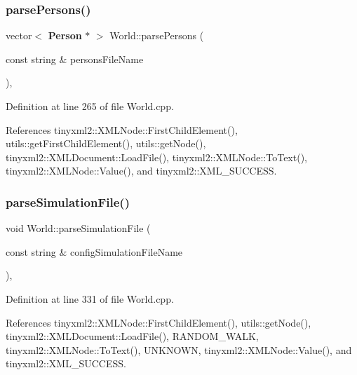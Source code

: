 \subsubsection{parsePersons()}
{\footnotesize\ttfamily vector$<$ \textbf{ Person} $\ast$ $>$ World\+::parse\+Persons (\begin{DoxyParamCaption}\item[{const string \&}]{persons\+File\+Name }\end{DoxyParamCaption})\hspace{0.3cm}{\ttfamily [private]}, {\ttfamily [noexcept]}}



Definition at line 265 of file World.\+cpp.



References tinyxml2\+::\+X\+M\+L\+Node\+::\+First\+Child\+Element(), utils\+::get\+First\+Child\+Element(), utils\+::get\+Node(), tinyxml2\+::\+X\+M\+L\+Document\+::\+Load\+File(), tinyxml2\+::\+X\+M\+L\+Node\+::\+To\+Text(), tinyxml2\+::\+X\+M\+L\+Node\+::\+Value(), and tinyxml2\+::\+X\+M\+L\+\_\+\+S\+U\+C\+C\+E\+SS.

\mbox{\label{class_world_a7f00dc79cc98281dbf7c51fb2c83e8d6}} 
\subsubsection{parseSimulationFile()}
{\footnotesize\ttfamily void World\+::parse\+Simulation\+File (\begin{DoxyParamCaption}\item[{const string \&}]{config\+Simulation\+File\+Name }\end{DoxyParamCaption})\hspace{0.3cm}{\ttfamily [private]}, {\ttfamily [noexcept]}}



Definition at line 331 of file World.\+cpp.



References tinyxml2\+::\+X\+M\+L\+Node\+::\+First\+Child\+Element(), utils\+::get\+Node(), tinyxml2\+::\+X\+M\+L\+Document\+::\+Load\+File(), R\+A\+N\+D\+O\+M\+\_\+\+W\+A\+LK, tinyxml2\+::\+X\+M\+L\+Node\+::\+To\+Text(), U\+N\+K\+N\+O\+WN, tinyxml2\+::\+X\+M\+L\+Node\+::\+Value(), and tinyxml2\+::\+X\+M\+L\+\_\+\+S\+U\+C\+C\+E\+SS.

\mbox{\label{class_world_af8d69e177beec5a9cf3c200f292db7db}} 
